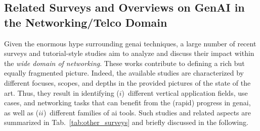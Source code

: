 \subsection{Related Surveys and Overviews on GenAI in the Networking/Telco Domain}
\label{subsec:related}


Given the enormous hype 
surrounding \gls{genai} techniques, 
a large number of recent surveys and tutorial-style studies aim to analyze and discuss their impact within the \emph{wide domain of networking}.
These works contribute to defining a rich but equally fragmented picture.
%
Indeed, the available studies are characterized by different focuses, scopes, and depths in the provided pictures of the state of the art. 
Thus, they result in identifying 
($i$)~different vertical application fields, use cases, and networking tasks that can benefit from the (rapid) progress in \gls{genai}, 
as well as ($ii$)~different families of \gls{ai} tools.
Such studies and related aspects are summarized in Tab.~\ref{tab:other_surveys} and briefly discussed in the following.
%

